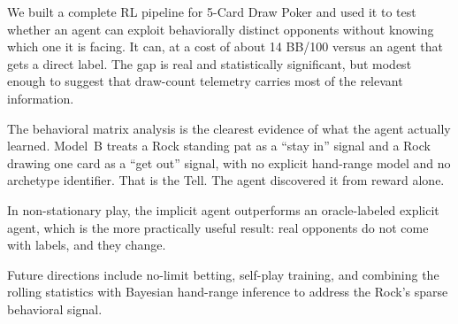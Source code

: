 \documentclass[11pt, conference]{IEEEtran}
\begin{document}
We built a complete RL pipeline for 5-Card Draw Poker and used it to test
whether an agent can exploit behaviorally distinct opponents without knowing
which one it is facing. It can, at a cost of about 14 BB/100 versus an
agent that gets a direct label. The gap is real and statistically
significant, but modest enough to suggest that draw-count telemetry carries
most of the relevant information.

The behavioral matrix analysis is the clearest evidence of what the agent
actually learned. Model~B treats a Rock standing pat as a ``stay in'' signal
and a Rock drawing one card as a ``get out'' signal, with no explicit hand-range
model and no archetype identifier. That is the Tell. The agent discovered it
from reward alone.

In non-stationary play, the implicit agent outperforms an oracle-labeled
explicit agent, which is the more practically useful result: real opponents
do not come with labels, and they change.

Future directions include no-limit betting, self-play training, and combining
the rolling statistics with Bayesian hand-range inference to address the
Rock's sparse behavioral signal.




\end{document}
